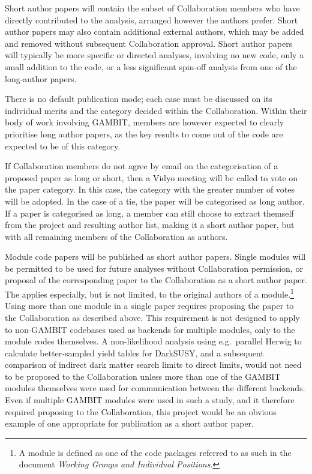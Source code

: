 Short author papers will contain the subset of Collaboration members who have directly contributed to the analysis, arranged however the authors prefer.  Short author papers may also contain additional external authors, which may be added and removed without subsequent Collaboration approval.  Short author papers will typically be more specific or directed analyses, involving no new code, only a small addition to the code, or a less significant spin-off analysis from one of the long-author papers.

There is no default publication mode; each case must be discussed on its individual merits and the category decided within the Collaboration.  Within their body of work involving GAMBIT, members are however expected to clearly prioritise long author papers, as the key results to come out of the code are expected to be of this category.

If Collaboration members do not agree by email on the categorisation of a proposed paper as long or short, then a Vidyo meeting will be called to vote on the paper category.  In this case, the category with the greater number of votes will be adopted.  In the case of a tie, the paper will be categorised as long author.  If a paper is categorised as long, a member can still choose to extract themself from the project and resulting author list, making it a short author paper, but with all remaining members of the Collaboration as authors.

Module code papers will be published as short author papers.  Single modules will be permitted to be used for future analyses without Collaboration permission, or proposal of the corresponding paper to the Collaboration as a short author paper.  The applies especially, but is not limited, to the original authors of a module.\footnote{A module is defined as one of the code packages referred to as such in the document \textit{Working Groups and Individual Positions}.}  Using more than one module in a single paper requires proposing the paper to the Collaboration as described above.  This requirement is not designed to apply to non-GAMBIT codebases used as backends for multiple modules, only to the module codes themselves.  A non-likelihood analysis using e.g.\ parallel Herwig to calculate better-sampled yield tables for DarkSUSY, and a subsequent comparison of indirect dark matter search limits to direct limits, would not need to be proposed to the Collaboration unless more than one of the GAMBIT modules themselves were used for communication between the different backends.  Even if multiple GAMBIT modules were used in such a study, and it therefore required proposing to the Collaboration, this project would be an obvious example of one appropriate for publication as a short author paper.

